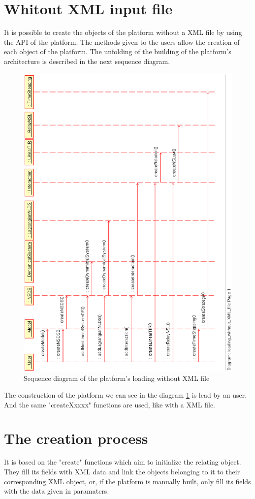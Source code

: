 \section{Whitout XML input file}
It is possible to create the objects of the platform without a XML file by using the API of the platform.
The methods given to the users allow the creation of each object of the platform. The
unfolding of the building of the platform's architecture is described in the next sequence diagram.
\begin{figure}
\begin{center}
	\includegraphics[scale=0.75, clip]{figure/platform_loading.ps}
	\caption{Sequence diagram of the platform's loading without XML file}
	\label{fig: platform's loading2}
\end{center}
\end{figure}

The construction of the platform we can see in the diagram \ref{fig: platform's loading2} is lead by an user. And the same
"createXxxxx" functions are used, like with a XML file.

\section{The creation process}
It is based on the "create" functions which aim to initialize the relating object. They fill its fields with XML data and
link the objects belonging to it to their corresponding XML object, or, if the platform is manually built, only fill
its fields with the data given in paramaters.
